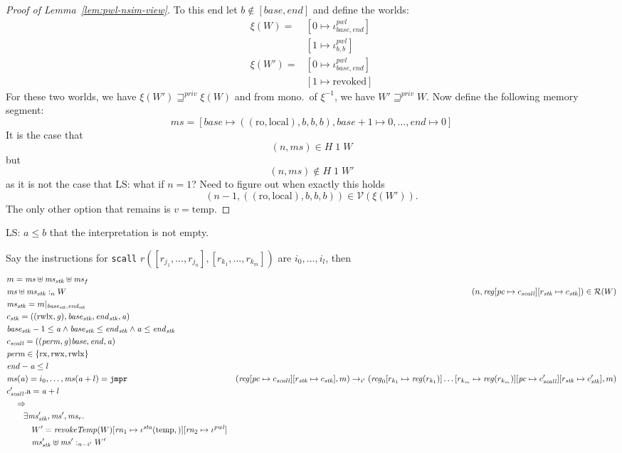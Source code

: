 \documentclass[a4paper]{article}
\newcommand\lau[1]{{\color{purple} \sf \footnotesize {LS: #1}}\\}
\newcommand{\var}[1]{\mathit{#1}}
\newcommand{\hs}{\var{ms}}
\newcommand{\ms}{\hs}
\newcommand{\gl}{\var{g}}
\newcommand{\pc}{\mathit{pc}}
\newcommand{\addr}{\var{a}}
\newcommand{\start}{\var{base}}
\newcommand{\addrend}{\var{end}}
\newcommand{\reg}{\var{reg}}
\newcommand{\heap}{\var{mem}}
\newcommand{\perm}{\var{perm}}
\newcommand{\stk}{\var{stk}}
\newcommand{\pwl}{\var{pwl}}
\newcommand{\sta}{\var{sta}}
\newcommand{\plainfun}[2]{
  \ifthenelse{\equal{#2}{}}
  {\mathit{#1}}
  {\mathit{#1}(#2)}
}
\newcommand{\revokeTemp}[1]{\plainfun{revokeTemp}{#1}}
\newcommand{\futurestr}{\mathbin{\sqsupseteq}^{\var{priv}}}
\newcommand{\heapSat}[3][\heap]{#1 :_{#2} #3}
\newcommand{\memSat}[3][n]{\heapSat[#2]{#1}{#3}}
\newcommand{\asmType}{\plaindom{AsmType}}
\newcommand{\plaindom}[1]{\mathrm{#1}}
\newcommand{\intr}[2]{\mathcal{#1}}
\newcommand{\valueintr}[1]{\intr{V}{#1}}
\newcommand{\regintr}[1]{\intr{R}{#1}}
\newcommand{\stdvr}{\valueintr{\asmType}}
\newcommand{\stdrr}{\regintr{\asmType}}
\newcommand{\npair}[2][n]{\left(#1,#2 \right)}
\newcommand{\plainperm}[1]{\mathrm{#1}}
\newcommand{\readonly}{\plainperm{ro}}
\newcommand{\exec}{\plainperm{rx}}
\newcommand{\rwx}{\plainperm{rwx}}
\newcommand{\rwlx}{\plainperm{rwlx}}
\newcommand{\local}{\plainperm{local}}
\newcommand{\plainview}[1]{\mathrm{#1}}
\newcommand{\temp}{\plainview{temp}}
\newcommand{\revoked}{\plainview{revoked}}
\newcommand{\step}[1][]{\rightarrow_{#1}}
\begin{document}
\begin{lemma}
\begin{proof}[Proof of Lemma~\ref{lem:pwl-nsim-view}]
  To this end let $b\not\in[\start,\addrend]$ and define the worlds:
  \begin{align*}
    \xi (W)  =& [0 \mapsto \iota^\pwl_{\start,\addrend}]  \\ 
              & [1 \mapsto \iota^\pwl_{b,b}] \\
    \xi (W')  =& [0 \mapsto \iota^\pwl_{\start,\addrend}]  \\ 
              & [1 \mapsto \revoked] 
  \end{align*}
  For these two worlds, we have $\xi(W') \futurestr \xi(W)$ and from mono.\ of $\xi^{-1}$, we have $W' \futurestr W$. Now define the following memory segment:
  \[
    \ms = [\start \mapsto ((\readonly,\local),b,b,b), \start+1 \mapsto 0, \dots , \addrend \mapsto 0]
  \]
  It is the case that
  \[
    \npair{\ms} \in H \; 1 \; W
  \]
  but
  \[
    \npair{\ms} \not\in H \; 1 \; W'
  \]
  as it is not the case that \lau{what if $n=1$? Need to figure out when exactly this holds}
  \[
    \npair[n-1]{((\readonly,\local),b,b,b)} \in \stdvr(\xi(W')).
  \]
  The only other option that remains is $v=\temp$.
\end{proof}
\lau{$a \leq b$ that the interpretation is not empty.}

\begin{lemma}
  Say the instructions for \texttt{scall} $r([r_{j_1},\dots,r_{j_n}],[r_{k_1},\dots, r_{k_m}])$ are $i_0,\dots,i_l$, then
  \begin{align*}
    & m = \ms \uplus \ms_\stk \uplus \ms_f \\
    & \memSat{\ms \uplus \ms_\stk}{W}
    & \npair{\reg[\pc \mapsto c_{\var{scall}}][r_\stk \mapsto c_\stk]} \in \stdrr(W) \\
    & \ms_\stk = m | _{\start_\stk,\addrend_\stk} \\
    & c_\stk = ((\rwlx,\gl),\start_\stk,\addrend_\stk,\addr) \\
    & \start_\stk-1 \leq \addr \land \start_\stk \leq \addrend_\stk \land \addr \leq \addrend_\stk \\
    & c_{\var{scall}} = ((\perm,\gl)\start,\addrend,\addr) \\
    & \perm \in \{\exec, \rwx, \rwlx\} \\
    & \addrend - \addr \leq l  \\
    & \ms(\addr) = i_0, \dots, \ms(\addr+l) = \mathtt{jmp r}
    & (\reg[\pc \mapsto c_{\var{scall}}][r_\stk \mapsto c_\stk],m) \step[i'] (\reg_0[r_{k_1} \mapsto \reg(r_{k_1})]\dots[r_{k_m} \mapsto \reg(r_{k_m})][\pc \mapsto c_{\var{scall}}'][r_\stk \mapsto c_\stk'],m) \\
    & c_{\var{scall}}'.\mathrm{a} = \addr+l \\
    & \quad \Rightarrow \\
    & \qquad \exists \ms_\stk', \ms', \ms_r \ldotp \\
    & \qquad \quad W' = \revokeTemp{W}[\var{rn}_1\mapsto\iota^\sta(\temp, )][\var{rn}_2 \mapsto \iota^\pwl] \\
    & \qquad \quad \memSat[n-i']{\ms_\stk'\uplus \ms'}{W'}
  \end{align*}
\end{lemma}


\end{lemma}
\end{document}

